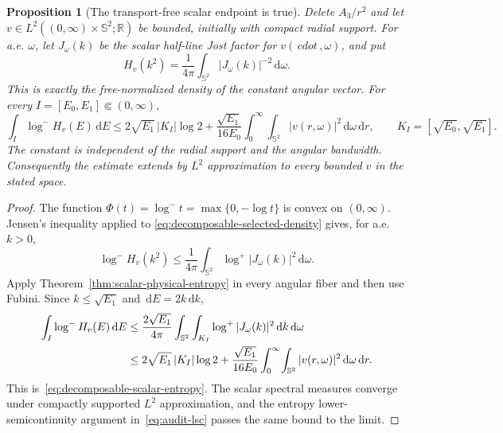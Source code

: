 \documentclass[11pt]{article}
\newcommand{\dd}{\,\mathrm d}
\newtheorem{proposition}[theorem]{Proposition}
\theoremstyle{definition}
\theoremstyle{remark}
\begin{document}
\begin{proposition}[The transport-free scalar endpoint is true]
\label{prop:decomposable-scalar-entropy}
Delete $A_3/r^2$ and let
$v\in L^2((0,\infty)\times\mathbb S^2;\mathbb R)$ be bounded, initially with
compact radial support.  For a.e. $\omega$, let $J_\omega(k)$ be the scalar
half-line Jost factor for $v(\,cdot\,,\omega)$, and put
\begin{equation}
 H_v(k^2)=\frac1{4\pi}\int_{\mathbb S^2}|J_\omega(k)|^{-2}\dd\omega.
 \label{eq:decomposable-selected-density}
\end{equation}
This is exactly the free-normalized density of the constant angular vector.
For every $I=[E_0,E_1]\Subset(0,\infty)$,
\begin{equation}
 \int_I\log^-H_v(E)\dd E
 \leq 2\sqrt{E_1}\,|K_I|\log2
 +\frac{\sqrt{E_1}}{16E_0}
       \int_0^\infty\!\int_{\mathbb S^2}|v(r,\omega)|^2
       \dd\omega\dd r,
 \qquad
 K_I=[\sqrt{E_0},\sqrt{E_1}].
 \label{eq:decomposable-scalar-entropy}
\end{equation}
The constant is independent of the radial support and the angular bandwidth.
Consequently the estimate extends by $L^2$ approximation to every bounded
$v$ in the stated space.
\end{proposition}

\begin{proof}
The function $\Phi(t)=\log^-t=\max\{0,-\log t\}$ is convex on
$(0,\infty)$.  Jensen's inequality applied to
\eqref{eq:decomposable-selected-density} gives, for a.e. $k>0$,
\begin{equation}
 \log^-H_v(k^2)
 \leq\frac1{4\pi}\int_{\mathbb S^2}
       \log^+|J_\omega(k)|^2\dd\omega.
 \label{eq:decomposable-density-jensen}
\end{equation}
Apply Theorem~\ref{thm:scalar-physical-entropy} in every angular fiber and
then use Fubini.  Since $k\leq\sqrt{E_1}$ and $\dd E=2k\dd k$,
\begin{align}
 \int_I\log^-H_v(E)\dd E
 &\leq\frac{2\sqrt{E_1}}{4\pi}
   \int_{\mathbb S^2}\int_{K_I}
       \log^+|J_\omega(k)|^2\dd k\dd\omega\notag\\
 &\leq2\sqrt{E_1}\,|K_I|\log2
 +\frac{\sqrt{E_1}}{16E_0}
   \int_0^\infty\!\int_{\mathbb S^2}|v(r,\omega)|^2
       \dd\omega\dd r.
\end{align}
This is~\eqref{eq:decomposable-scalar-entropy}.  The scalar spectral measures
converge under compactly supported $L^2$ approximation, and the entropy
lower-semicontinuity argument in~\eqref{eq:audit-lsc} passes the same bound to
the limit.
\end{proof}
\end{document}

